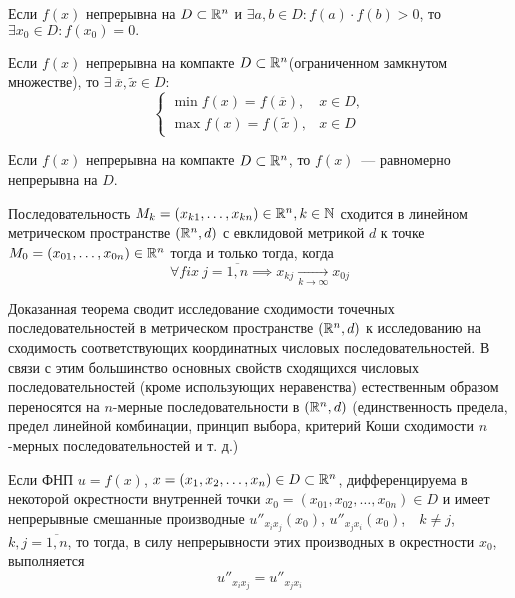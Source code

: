 \documentclass[../main.tex]{subfiles}
\begin{document}
\begin{crl*}
			Если $f(x)$ непрерывна на $D \subset \mathbb{R}^n$ и $\exists a,b \in D: 
			f(a) \cdot f(b) > 0$, то $\exists x_0 \in D : f(x_0) = 0.$
	\end{crl*}
\begin{thm}[Вейерштрасс]
		Если $f(x)$ непрерывна на компакте $D \subset \mathbb{R}^n$(ограниченном 
		замкнутом множестве), то $\exists\ \overline{x}, \widetilde{x} \in D:$
		\[ 
		\begin{cases}
		\min f(x) = f(\overline{x}),& x \in D, \\
		\max f(x) = f(\widetilde{x}),& x \in D
		\end{cases}
		\]
	\end{thm}
\begin{thm}[Кантор]
		Если $f(x)$ непрерывна на компакте $D \subset \mathbb{R}^n$, то $f(x)$~---
		равномерно непрерывна на $D$.
	\end{thm}
\begin{thm}
    Последовательность $M_k = (x_{k1}, \dots, x_{kn}) \in \mathbb{R}^n, k 
    \in \mathbb{N}$ сходится в линейном метрическом пространстве $(\mathbb{R}^n, d)$
    с евклидовой метрикой $d$ к точке $M_0 = (x_{01}, \dots, x_{0n})
    \in \mathbb{R}^n$ тогда и только тогда, когда
    \begin{equation}
    \label{krit-posl}
      \forall fix\ j = \overline{1, n} \implies
      x_{kj}\underset{k\rightarrow\infty}{\longrightarrow} x_{0j}
    \end{equation}
  \end{thm}
\begin{rem}
    Доказанная теорема сводит исследование сходимости точечных 
    последовательностей в метрическом пространстве $(\mathbb{R}^n, d)$ к 
    исследованию на сходимость соответствующих координатных числовых 
    последовательностей.
    В связи с этим большинство основных свойств сходящихся числовых 
    последовательностей (кроме использующих неравенства) естественным
    образом переносятся на $n$-мерные последовательности в $(\mathbb{R}^n, d)$
    (единственность предела, предел линейной комбинации, принцип 
    выбора, критерий Коши сходимости $n$-мерных последовательностей и 
    т. д.)
  \end{rem}
\begin{thm}
		\label{secdiffeq}
		Если ФНП $u = f(x)$, $x = \left(x_1, x_2, \dots, x_n\right)\in 
		D\subset\mathbb{R}^n$, дифференцируема в некоторой окрестности внутренней 
		точки $x_0 = \left(x_{01}, x_{02}, \dots, x_{0n}\right)\in D$ и имеет 
		непрерывные смешанные производные $u''_{x_ix_j}(x_0)$, 
		$u''_{x_jx_i}(x_0)$,\ \ $k\ne j$,\ \ $k, j = \overline{1, n}$, то тогда, 
		в силу непрерывности этих производных в окрестности $x_0$, выполняется
		\begin{equation}
			u''_{x_ix_j} = u''_{x_jx_i}
			\label{11:diff}
		\end{equation}
	\end{thm}
\end{document}
